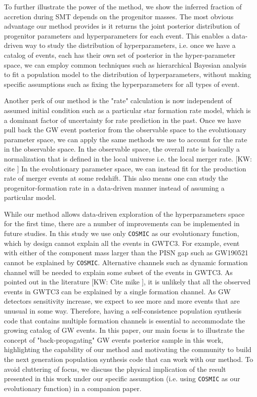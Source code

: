 \documentclass[twocolumn]{aastex631}
\newcommand{\kw}[1]{{\color{rb4}[KW: #1 ]}}
\begin{document}
To further illustrate the power of the method, we show the inferred fraction of accretion during SMT depends on the progenitor masses.
The most obvious advantage our method provides is it returns the joint posterior distribution of progenitor parameters and hyperparameters for each event.
This enables a data-driven way to study the distribution of hyperparameters,
i.e. once we have a catalog of events, each has their own set of posterior in the hyper-parameter space,
we can employ common techniques such as hierarchical Bayesian analysis to fit a population model to the distribution of hyperparameters,
without making specific assumptions such as fixing the hyperparameters for all types of event. 

Another perk of our method is the "rate" calculation is now independent of assumed initial condition such as a particular star formation rate model,
which is a dominant factor of uncertainty for rate prediction in the past.
Once we have pull back the GW event posterior from the observable space to the evolutionary parameter space,
we can apply the same methods we use to account for the rate in the observable space.
In the observable space, the overall rate is basically a normalization that is defined in the local universe i.e. the local merger rate. \kw{cite}
In the evolutionary parameter space, we can instead fit for the production rate of merger events at some redshift.
This also means one can study the progenitor-formation rate in a data-driven manner instead of assuming a particular model.


While our method allows data-driven exploration of the hyperparameters space for the first time, there are a number of improvements can be implemented in future studies.
In this study we use only \texttt{COSMIC} as our evolutionary function, which by design cannot explain all the events in GWTC3.
For example, event with either of the component mass larger than the PISN gap such as GW190521 cannot be explained by \texttt{COSMIC}.
Alternative channels such as dynamic formation channel will be needed to explain some subset of the events in GWTC3.
As pointed out in the literature \kw{Cite mike}, it is unlikely that all the observed events in GWTC3 can be explained by a single formation channel.
As GW detectors sensitivity increase, we expect to see more and more events that are unusual in some way.
Therefore, having a self-consistence population synthesis code that contains multiple formation channels is essential to accommodate the growing catalog of GW events.
In this paper, our main focus is to illustrate the concept of "back-propagating" GW events posterior sample in this work,
highlighting the capability of our method and motivating the community to build the next generation population synthesis code that can work with our method.
To avoid cluttering of focus, we discuss the physical implication of the result presented in this work under our specific assumption (i.e. using \texttt{COSMIC} as our evolutionary function) in a companion paper.
\end{document}
